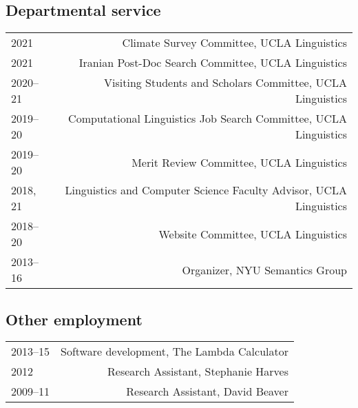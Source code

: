 \documentclass[12pt]{article}
\begin{document}
\subsection*{Departmental service}

\begin{longtable}{LR}
  2021       & Climate Survey Committee, UCLA Linguistics\\
  2021       & Iranian Post-Doc Search Committee, UCLA Linguistics\\
  2020--21   & Visiting Students and Scholars Committee, UCLA Linguistics\\
  2019--20   & Computational Linguistics Job Search Committee, UCLA Linguistics\\
  2019--20   & Merit Review Committee, UCLA Linguistics\\
  2018, 21%
             & Linguistics and Computer Science Faculty Advisor, UCLA Linguistics\\
  2018--20   & Website Committee, UCLA Linguistics\\
  2013--16   & Organizer, NYU Semantics Group
\end{longtable}

\subsection*{Other employment}
\begin{longtable}{LR}
  2013--15   & Software development, The Lambda Calculator
               \\
  2012       & Research Assistant, Stephanie Harves\\
  2009--11   & Research Assistant, David Beaver
\end{longtable}


\end{document}
